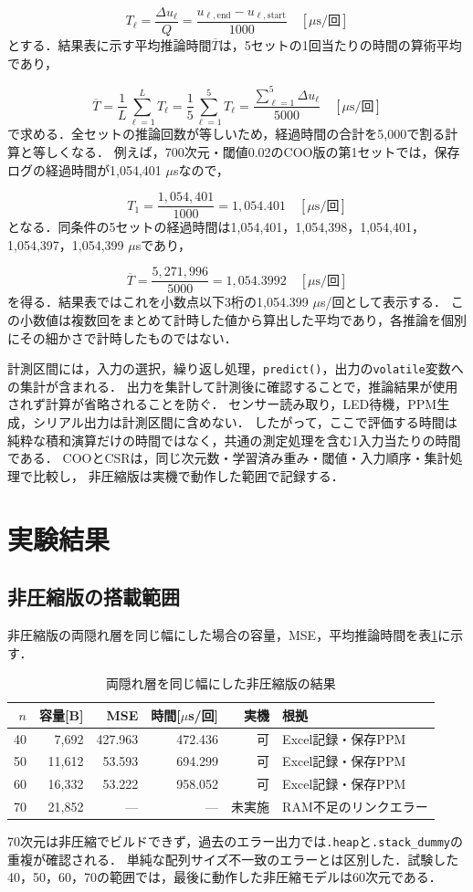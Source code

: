 \documentclass[a4paper,11pt]{article}
\newcommand{\code}[1]{\nolinkurl{#1}}
\begin{document}
\[
    T_\ell=\frac{\Delta u_\ell}{Q}
    =\frac{u_{\ell,\mathrm{end}}-u_{\ell,\mathrm{start}}}{1000}
    \quad[\mu\mathrm{s}/\text{回}]
\]
%
とする．結果表に示す平均推論時間$\overline{T}$は，5セットの1回当たりの時間の算術平均であり，

\[
    \overline{T}=\frac{1}{L}\sum_{\ell=1}^{L}T_\ell
    =\frac{1}{5}\sum_{\ell=1}^{5}T_\ell
    =\frac{\sum_{\ell=1}^{5}\Delta u_\ell}{5000}
    \quad[\mu\mathrm{s}/\text{回}]
\]
%
で求める．全セットの推論回数が等しいため，経過時間の合計を5,000で割る計算と等しくなる．
例えば，700次元・閾値0.02のCOO版の第1セットでは，保存ログの経過時間が1,054,401 $\mu$sなので，

\[
    T_1=\frac{1,054,401}{1000}=1,054.401
    \quad[\mu\mathrm{s}/\text{回}]
\]
%
となる．同条件の5セットの経過時間は1,054,401，1,054,398，1,054,401，1,054,397，1,054,399 $\mu$sであり，

\[
    \overline{T}=\frac{5,271,996}{5000}
    =1,054.3992\quad[\mu\mathrm{s}/\text{回}]
\]
%
を得る．結果表ではこれを小数点以下3桁の1,054.399 $\mu$s/回として表示する．
この小数値は複数回をまとめて計時した値から算出した平均であり，各推論を個別にその細かさで計時したものではない．

計測区間には，入力の選択，繰り返し処理，\code{predict()}，出力の\code{volatile}変数への集計が含まれる．
出力を集計して計測後に確認することで，推論結果が使用されず計算が省略されることを防ぐ．
センサー読み取り，LED待機，PPM生成，シリアル出力は計測区間に含めない．
したがって，ここで評価する時間は純粋な積和演算だけの時間ではなく，共通の測定処理を含む1入力当たりの時間である．
COOとCSRは，同じ次元数・学習済み重み・閾値・入力順序・集計処理で比較し，
非圧縮版は実機で動作した範囲で記録する．

\section{実験結果}
\subsection{非圧縮版の搭載範囲}
非圧縮版の両隠れ層を同じ幅にした場合の容量，MSE，平均推論時間を表\ref{tab:non-compressed}に示す．

\begin{table}[H]\centering\small
\caption{両隠れ層を同じ幅にした非圧縮版の結果}\label{tab:non-compressed}
\begin{tabular}{rrrrrl}\toprule
$n$&容量[B]&MSE&時間[$\mu$s/回]&実機&根拠\\\midrule
40&7,692&427.963&472.436&可&Excel記録・保存PPM\\\midrule
50&11,612&53.593&694.299&可&Excel記録・保存PPM\\\midrule
60&16,332&53.222&958.052&可&Excel記録・保存PPM\\\midrule
70&21,852&---&---&未実施&RAM不足のリンクエラー\\\bottomrule
\end{tabular}\end{table}
%
70次元は非圧縮でビルドできず，過去のエラー出力では\code{.heap}と\code{.stack_dummy}の重複が確認される．
単純な配列サイズ不一致のエラーとは区別した．試験した40，50，60，70の範囲では，最後に動作した非圧縮モデルは60次元である．
\end{document}
